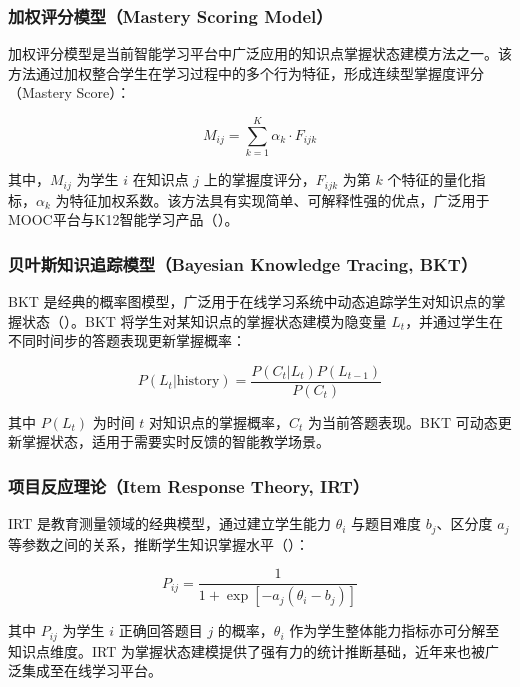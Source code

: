 \subsubsection{加权评分模型（Mastery Scoring Model）}

加权评分模型是当前智能学习平台中广泛应用的知识点掌握状态建模方法之一。该方法通过加权整合学生在学习过程中的多个行为特征，形成连续型掌握度评分（Mastery Score）：

\begin{equation}
M_{ij} = \sum_{k=1}^{K} \alpha_k \cdot F_{ijk}
\end{equation}

其中，$M_{ij}$ 为学生 $i$ 在知识点 $j$ 上的掌握度评分，$F_{ijk}$ 为第 $k$ 个特征的量化指标，$\alpha_k$ 为特征加权系数。该方法具有实现简单、可解释性强的优点，广泛用于MOOC平台与K12智能学习产品（\cite{xu2019usersegmentation,sun2021moocpricing}）。

\subsubsection{贝叶斯知识追踪模型（Bayesian Knowledge Tracing, BKT）}

BKT 是经典的概率图模型，广泛用于在线学习系统中动态追踪学生对知识点的掌握状态（\cite{corbett_anderson_1995}）。BKT 将学生对某知识点的掌握状态建模为隐变量 $L_t$，并通过学生在不同时间步的答题表现更新掌握概率：

\begin{equation}
P(L_t | \text{history}) = \frac{P(C_t | L_t) P(L_{t-1})}{P(C_t)}
\end{equation}

其中 $P(L_t)$ 为时间 $t$ 对知识点的掌握概率，$C_t$ 为当前答题表现。BKT 可动态更新掌握状态，适用于需要实时反馈的智能教学场景。

\subsubsection{项目反应理论（Item Response Theory, IRT）}

IRT 是教育测量领域的经典模型，通过建立学生能力 $\theta_i$ 与题目难度 $b_j$、区分度 $a_j$ 等参数之间的关系，推断学生知识掌握水平（\cite{lord_1980}）：

\begin{equation}
P_{ij} = \frac{1}{1 + \exp[-a_j(\theta_i - b_j)]}
\end{equation}

其中 $P_{ij}$ 为学生 $i$ 正确回答题目 $j$ 的概率，$\theta_i$ 作为学生整体能力指标亦可分解至知识点维度。IRT 为掌握状态建模提供了强有力的统计推断基础，近年来也被广泛集成至在线学习平台。

